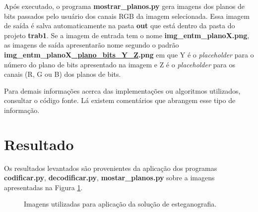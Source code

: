 \documentclass{article}
\begin{document}
\noindent
Após executado, o programa \textbf{mostrar\_planos.py} gera imagens dos planos de bits passados pelo usuário dos canais RGB da imagem selecionada. Essa imagem de saída é salva automaticamente na pasta \textbf{out} que está dentro da pasta do projeto \textbf{trab1}. Se a imagem de entrada tem o nome \textbf{img\_entm\_planoX.png}, as imagens de saída apresentarão nome segundo o padrão \textbf{img\_entm\_planoX\underline{\_plano\_bits\_Y\_Z}.png} em que Y é o \textit{placeholder} para o número do plano de bits apresentado na imagem e Z é o \textit{placeholder} para os canais (R, G ou B) dos planos de bits.

Para demais informações acerca das implementações ou algoritmos utilizados, consultar o código fonte. Lá existem comentários que abrangem esse tipo de informação.

%
\section{Resultado}
Os resultados levantados são provenientes da aplicação dos programas \textbf{codificar.py}, \textbf{decodificar.py}, \textbf{mostar\_planos.py} sobre a imagens apresentadas na Figura \ref{fig:imagem:entrada}. 

\begin{figure}[htp]%
	\centering
	\qquad
	\caption{Imagens utilizadas para aplicação da solução de esteganografia.}%
	\label{fig:imagem:entrada}%
\end{figure}
\end{document}
